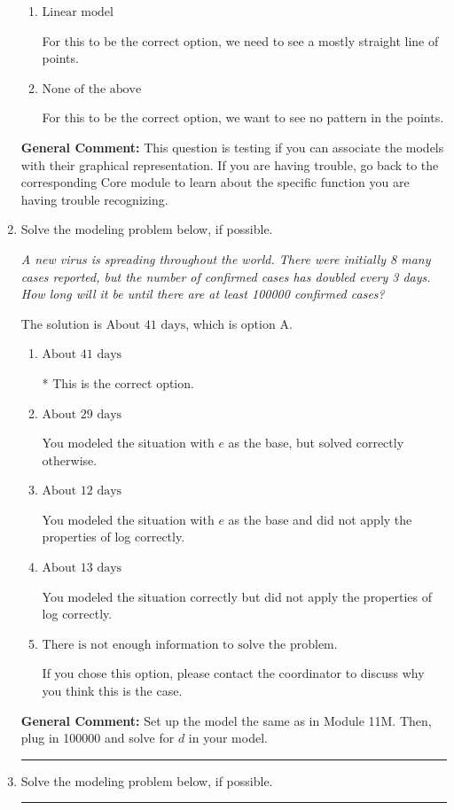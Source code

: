 \documentclass{extbook}[14pt]
\newcommand{\litem}[1]{\item #1

\rule{\textwidth}{0.4pt}}
\begin{document}
\begin{enumerate}
{\begin{enumerate}[label=\Alph*.]
For this to be the correct option, we want a rapid change early, then an extremely slow change later.
\item \( \text{Linear model} \)

For this to be the correct option, we need to see a mostly straight line of points.
\item \( \text{None of the above} \)

For this to be the correct option, we want to see no pattern in the points.
\end{enumerate}

\textbf{General Comment:} This question is testing if you can associate the models with their graphical representation. If you are having trouble, go back to the corresponding Core module to learn about the specific function you are having trouble recognizing.
}
\litem{
Solve the modeling problem below, if possible.

\begin{center}
    \textit{ A new virus is spreading throughout the world. There were initially 8 many cases reported, but the number of confirmed cases has doubled every 3 days. How long will it be until there are at least 100000 confirmed cases? }
\end{center}
The solution is \( \text{About } 41 \text{ days} \), which is option A.\begin{enumerate}[label=\Alph*.]
\item \( \text{About } 41 \text{ days} \)

* This is the correct option.
\item \( \text{About } 29 \text{ days} \)

You modeled the situation with $e$ as the base, but solved correctly otherwise.
\item \( \text{About } 12 \text{ days} \)

You modeled the situation with $e$ as the base and did not apply the properties of log correctly.
\item \( \text{About } 13 \text{ days} \)

You modeled the situation correctly but did not apply the properties of log correctly.
\item \( \text{There is not enough information to solve the problem.} \)

If you chose this option, please contact the coordinator to discuss why you think this is the case.
\end{enumerate}

\textbf{General Comment:} Set up the model the same as in Module 11M. Then, plug in 100000 and solve for $d$ in your model.
}
\litem{
Solve the modeling problem below, if possible.

}
\end{enumerate}
\end{document}
